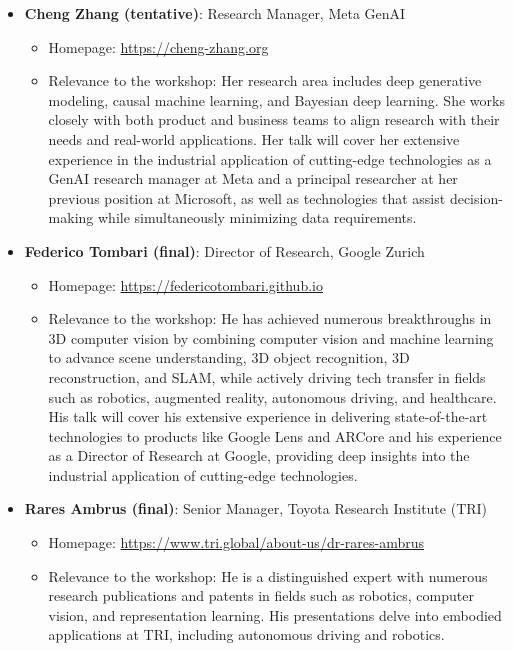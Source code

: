 \documentclass{article}
\begin{document}
\begin{itemize}
    \item {\bf Cheng Zhang (tentative)}: Research Manager, Meta GenAI
    \begin{itemize}
        \item Homepage: \href{https://cheng-zhang.org}{\url{https://cheng-zhang.org}}
        \item Relevance to the workshop: Her research area includes deep generative modeling, causal machine learning, and Bayesian deep learning. She works closely with both product and business teams to align research with their needs and real-world applications. Her talk will cover her extensive experience in the industrial application of cutting-edge technologies as a GenAI research manager at Meta and a principal researcher at her previous position at Microsoft, as well as technologies that assist decision-making while simultaneously minimizing data requirements.
    \end{itemize}
    \item {\bf Federico Tombari (final)}: Director of Research, Google Zurich 
    \begin{itemize}
        \item Homepage: \href{https://federicotombari.github.io}{\url{https://federicotombari.github.io}}
        \item Relevance to the workshop: He has achieved numerous breakthroughs in 3D computer vision by combining computer vision and machine learning to advance scene understanding, 3D object recognition, 3D reconstruction, and SLAM, while actively driving tech transfer in fields such as robotics, augmented reality, autonomous driving, and healthcare. His talk will cover his extensive experience in delivering state-of-the-art technologies to products like Google Lens and ARCore and his experience as a Director of Research at Google, providing deep insights into the industrial application of cutting-edge technologies.
    \end{itemize}
    \item {\bf Rares Ambrus (final)}: Senior Manager, Toyota Research Institute (TRI)
    \begin{itemize}
        \item Homepage: \href{https://www.tri.global/about-us/dr-rares-ambrus}{\url{https://www.tri.global/about-us/dr-rares-ambrus}}
        \item Relevance to the workshop: He is a distinguished expert with numerous research publications and patents in fields such as robotics, computer vision, and representation learning. His presentations delve into embodied applications at TRI, including autonomous driving and robotics.

\end{itemize}
\end{itemize}
\end{document}
